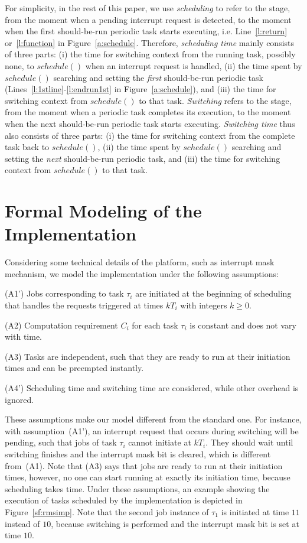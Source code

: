 \documentclass[10pt,journal]{IEEEtran}
\begin{document}
For simplicity, in the rest of this paper, we use \emph{scheduling} to
refer to the stage, from the moment when a pending interrupt request
is detected, to the moment when the first should-be-run periodic task
starts executing, i.e. Line~\ref{l:return} or~\ref{l:function} in
Figure~\ref{a:schedule}. Therefore, \emph{scheduling time} mainly
consists of three parts: (i) the time for switching context from the
running task, possibly none, to $schedule()$ when an interrupt request
is handled, (ii) the time spent by $schedule()$ searching and setting
the \emph{first} should-be-run periodic task
(Lines~\ref{l:1stline}-\ref{l:endrun1st} in Figure~\ref{a:schedule}),
and (iii) the time for switching context from $schedule()$ to that
task. \emph{Switching} refers to the stage, from the moment when a
periodic task completes its execution, to the moment when the next
should-be-run periodic task starts executing. \emph{Switching time}
thus also consists of three parts: (i) the time for switching context
from the complete task back to $schedule()$, (ii) the time spent by
$schedule()$ searching and setting the \emph{next} should-be-run
periodic task, and (iii) the time for switching context from
$schedule()$ to that task.


\section{Formal Modeling of the Implementation}
\label{s:formalism}
Considering some technical details of the platform, such as interrupt
mask mechanism, we model the implementation under the following
assumptions:

(A1') Jobs corresponding to task $\tau_i$ are initiated at the
beginning of scheduling that handles the requests triggered at times
$kT_i$ with integers $k\ge 0$.

(A2) Computation requirement $C_i$ for each task $\tau_i$ is constant
and does not vary with time.

(A3) Tasks are independent, such that they are ready to run at their
initiation times and can be preempted instantly.

(A4') Scheduling time and switching time are considered, while other
overhead is ignored.

These assumptions make our model different from the standard one. For
instance, with assumption~(A1'), an interrupt request that occurs
during switching will be pending, such that jobs of task $\tau_i$
cannot initiate at $kT_i$. They should wait until switching finishes
and the interrupt mask bit is cleared, which is different
from~(A1). Note that (A3) says that jobs are ready to run at their
initiation times, however, no one can start running at exactly its
initiation time, because scheduling takes time. Under these
assumptions, an example showing the execution of tasks scheduled by
the implementation is depicted in Figure~\ref{sf:rmsimp}. Note that
the second job instance of $\tau_1$ is initiated at time $11$ instead
of $10$, because switching is performed and the interrupt mask bit is
set at time $10$.
\end{document}
